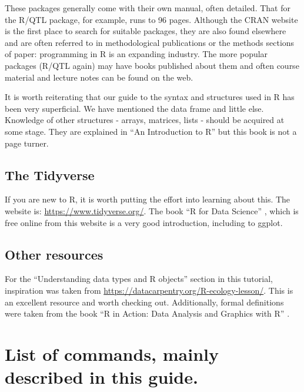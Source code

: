 \documentclass[
]{book}
\makeatletter
\newenvironment{kframe}{%
\medskip{}
\setlength{\fboxsep}{.8em}
 \def\at@end@of@kframe{}%
 \ifinner\ifhmode%
  \def\at@end@of@kframe{\end{minipage}}%
  \begin{minipage}{\columnwidth}%
 \fi\fi%
 \def\FrameCommand##1{\hskip\@totalleftmargin \hskip-\fboxsep
 \colorbox{shadecolor}{##1}\hskip-\fboxsep
     \hskip-\linewidth \hskip-\@totalleftmargin \hskip\columnwidth}%
 \MakeFramed {\advance\hsize-\width
   \@totalleftmargin\z@ \linewidth\hsize
   \@setminipage}}%
 {\par\unskip\endMakeFramed%
 \at@end@of@kframe}
\newenvironment{rmdblock}[1]
  {
  \begin{itemize}
  \renewcommand{\labelitemi}{
    \raisebox{-.7\height}[0pt][0pt]{
      {\setkeys{Gin}{width=3em,keepaspectratio}\texttt{[image: images/\#1]}}
    }
  }
  \setlength{\fboxsep}{1em}
  \begin{kframe}
  \item
  }
  {
  \end{kframe}
  \end{itemize}
  }
\newenvironment{rmdwarning}
  {\begin{rmdblock}{warning}}
  {\end{rmdblock}}
\makeatother
\begin{document}
These packages generally come with their own manual, often detailed. That for the R/QTL package, for example, runs to 96 pages. Although the CRAN website is the first place to search for suitable packages, they are also found elsewhere and are often referred to in methodological publications or the methods sections of paper: programming in R is an expanding industry. The more popular packages (R/QTL again) may have books published about them and often course material and lecture notes can be found on the web.

\begin{rmdwarning}
It is worth reiterating that our guide to the syntax and structures used in R has been very superficial. We have mentioned the data frame and little else. Knowledge of other structures - arrays, matrices, lists - should be acquired at some stage. They are explained in ``An Introduction to R'' but this book is not a page turner.
\end{rmdwarning}

\hypertarget{the-tidyverse}{%
\subsection{The Tidyverse}\label{the-tidyverse}}

If you are new to R, it is worth putting the effort into learning about this. The website is: \url{https://www.tidyverse.org/}. The book ``R for Data Science'' \citep{wickham_r_2016}, which is free online from this website is a very good introduction, including to ggplot.

\hypertarget{other-resources}{%
\subsection{Other resources}\label{other-resources}}

For the ``Understanding data types and R objects'' section in this tutorial, inspiration was taken from \url{https://datacarpentry.org/R-ecology-lesson/}. This is an excellent resource and worth checking out. Additionally, formal definitions were taken from the book ``R in Action: Data Analysis and Graphics with R'' \citep{kabacoff_r_2011}.

\hypertarget{list-of-commands-mainly-described-in-this-guide.}{%
\section{List of commands, mainly described in this guide.}\label{list-of-commands-mainly-described-in-this-guide.}}
\end{document}
